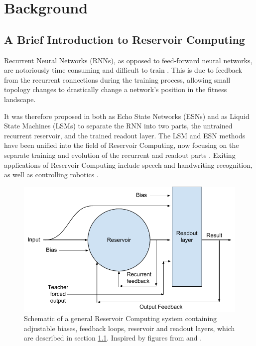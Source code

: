 \chapter{Background}
\label{chapter:background}

\section{A Brief Introduction to Reservoir Computing}
\label{section:reservoir-computing-introduction}

Recurrent Neural Networks (RNNs), as opposed to feed-forward neural networks,
are notoriously time consuming and difficult to train \cite{Schrauwen2007}.
This is due to feedback from the recurrent connections during the training process,
allowing small topology changes to drastically change a network's position in the fitness landscape.

It was therefore proposed in both \cite{jaeger2002adaptive} as Echo State Networks (ESNs)
and \cite{natschlager2002liquid} as Liquid State Machines (LSMs) to separate the RNN into two parts,
the untrained recurrent reservoir, and the trained readout layer.
The LSM and ESN methods have been unified into the field of Reservoir Computing,
now focusing on the separate training and evolution of the recurrent and readout parts \cite{lukovsevivcius2012reservoir}.
Exiting applications of Reservoir Computing include speech and handwriting recognition,
as well as controlling robotics \cite{lukovsevivcius2012reservoir}.

\begin{figure}[ht]
    \caption[Schematic of a general reservoir computing system]{
        Schematic of a general Reservoir Computing system containing adjustable biases, feedback loops, reservoir and readout layers,
        which are described in section \ref{section:reservoir-computing-introduction}.
        Inspired by figures from \cite{Schrauwen2007} and \cite{Jaeger:2007}.
    }
    \label{fig:rc-schema}
    \includegraphics[width=\columnwidth]{background/reservoir_computing_schema.pdf}
\end{figure}

